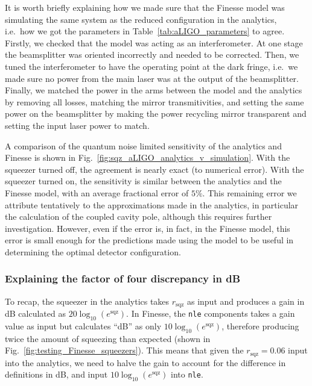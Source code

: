 \documentclass[aps,pra,superscriptaddress,reprint,nofootinbib]{revtex4-1}
\newcommand{\code}[1]{\texttt{#1}}
\begin{document}
It is worth briefly explaining how we made sure that the Finesse model was simulating the same system as the reduced configuration in the analytics, i.e.\ how we got the parameters in Table~\ref{tab:aLIGO_parameters} to agree. Firstly, we checked that the model was acting as an interferometer. At one stage the beamsplitter was oriented incorrectly and needed to be corrected. Then, we tuned the interferometer to have the operating point at the dark fringe, i.e.\ we made sure no power from the main laser was at the output of the beamsplitter. Finally, we matched the power in the arms between the model and the analytics by removing all losses, matching the mirror transmitivities, and setting the same power on the beamsplitter by making the power recycling mirror transparent and setting the input laser power to match.


A comparison of the quantum noise limited sensitivity of the analytics and Finesse is shown in Fig.~\ref{fig:sqz_aLIGO_analytics_v_simulation}. With the squeezer turned off, the agreement is nearly exact (to numerical error). With the squeezer turned on, the sensitivity is similar between the analytics and the Finesse model, with an average fractional error of $5\%$.
This remaining error we attribute tentatively to the approximations made in the analytics, in particular the calculation of the coupled cavity pole, although this requires further investigation. However, even if the error is, in fact, in the Finesse model, this error is small enough for the predictions made using the model to be useful in determining the optimal detector configuration.


\subsubsection{Explaining the factor of four discrepancy in dB}

To recap, the squeezer in the analytics takes $r_\mathrm{sqz}$ as input and produces a gain in dB calculated as $20 \log_{10}(e^\mathrm{sqz})$. In Finesse, the \code{nle} components takes a gain value as input but calculates “dB” as only $10 \log_{10}(e^\mathrm{sqz})$, therefore producing twice the amount of squeezing than expected (shown in Fig.~\ref{fig:testing_Finesse_squeezers}). This means that given the $r_\mathrm{sqz} = 0.06$ input into the analytics, we need to halve the gain to account for the difference in definitions in dB, and input $10 \log_{10}(e^\mathrm{sqz})$ into \code{nle}.
\end{document}
